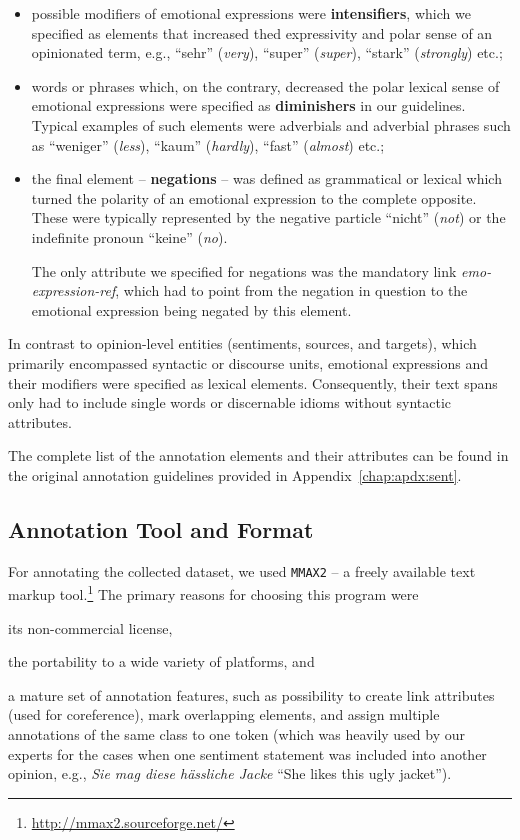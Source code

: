 \begin{itemize}
\item
  possible modifiers of emotional expressions were
  \textbf{intensifiers}, which we specified as elements that increased
  thed expressivity and polar sense of an opinionated term, e.g.,
  ``sehr'' (\emph{very}), ``super'' (\emph{super}), ``stark''
  (\emph{strongly}) etc.;

\item
  words or phrases which, on the contrary, decreased the polar lexical
  sense of emotional expressions were specified as
  \textbf{diminishers} in our guidelines.  Typical examples of such
  elements were adverbials and adverbial phrases such as ``weniger''
  (\emph{less}), ``kaum'' (\emph{hardly}), ``fast'' (\emph{almost})
  etc.;

\item
  the final element -- \textbf{negations} -- was defined as
  grammatical or lexical which turned the polarity of an emotional
  expression to the complete opposite.  These were typically
  represented by the negative particle ``nicht'' (\emph{not}) or the
  indefinite pronoun ``keine'' (\emph{no}).

  The only attribute we specified for negations was the mandatory link
  \emph{emo-expression-ref}, which had to point from the negation in
  question to the emotional expression being negated by this element.
\end{itemize}

In contrast to opinion-level entities (sentiments, sources, and
targets), which primarily encompassed syntactic or discourse units,
emotional expressions and their modifiers were specified as lexical
elements.  Consequently, their text spans only had to include single
words or discernable idioms without syntactic attributes.

The complete list of the annotation elements and their attributes can
be found in the original annotation guidelines provided in
Appendix~\ref{chap:apdx:sent}.

\subsection{Annotation Tool and Format}\label{subsec:snt:tformat}

For annotating the collected dataset, we used \texttt{MMAX2} -- a
freely available text markup
tool.\footnote{\url{http://mmax2.sourceforge.net/}} The
primary reasons for choosing this program were
\begin{inparaenum}
 \item its non-commercial license,
 \item the portability to a wide variety of platforms, and
 \item a mature set of annotation features, such as possibility to
   create link attributes (used for coreference), mark overlapping
   elements, and assign multiple annotations of the same class to one
   token (which was heavily used by our experts for the cases when one
   sentiment statement was included into another opinion, e.g.,
   \emph{Sie mag diese h\"assliche Jacke} ``She likes this ugly
   jacket'').
\end{inparaenum}

